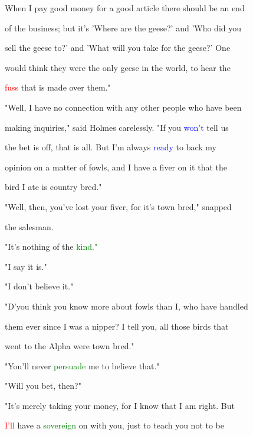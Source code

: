  When I \textcolor{BurntOrange}{pay} \textcolor{BurntOrange}{good} \textcolor{BurntOrange}{money} for a \textcolor{BurntOrange}{good} article there should be an end

 of the business; but it's 'Where are the geese?' and 'Who did you

 sell the geese to?' and 'What will you take for the geese?' One

 would think they were the only geese in the world, to hear the

 \textcolor{red}{fuss} that is made over them."



 "Well, I have no connection with any other people who have been

 making \textcolor{BurntOrange}{inquiries,"} said Holmes carelessly. "If you \textcolor{blue}{won't} tell us

 the bet is off, that is all. But I'm always \textcolor{blue}{ready} to back my

 opinion on a matter of fowls, and I have a fiver on it that the

 bird I ate is country bred."



 "Well, then, you've \textcolor{BurntOrange}{lost} your fiver, for it's town bred," snapped

 the salesman.



 "It's nothing of the \textcolor{green}{kind."}



 "I say it is."



 "I don't believe it."



 "D'you think you know more about fowls than I, who have handled

 them ever since I was a nipper? I tell you, all those birds that

 went to the Alpha were town bred."



 "You'll never \textcolor{green}{persuade} me to believe that."



 "Will you bet, then?"



 "It's merely taking your \textcolor{BurntOrange}{money,} for I know that I am right. But

 \textcolor{red}{I'll} have a \textcolor{green}{sovereign} on with you, just to \textcolor{BurntOrange}{teach} you not to be

